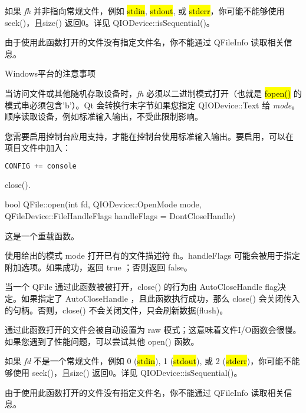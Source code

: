 \begin{compactitem}
\item 如果 \emph{fh} 并非指向常规文件，例如 \hl{stdin}, \hl{stdout}, 或 \hl{stderr}，你可能不能够使用 seek()，且size() 返回0。详见 QIODevice::isSequential()。
\item 由于使用此函数打开的文件没有指定文件名，你不能通过 QFileInfo 读取相关信息。
\end{compactitem}

Windows平台的注意事项

当访问文件或其他随机存取设备时，\emph{fh} 必须以二进制模式打开（也就是
\hl{fopen()} 的模式串必须包含'b'）。Qt 会转换行末字节如果您指定
QIODevice::Text 给 \emph{
mode}。顺序读取设备，例如标准输入输出，不受此限制影响。

您需要启用控制台应用支持，才能在控制台使用标准输入输出。要启用，可以在
项目文件中加入：

\begin{lstlisting}[language=C++]
CONFIG += console
\end{lstlisting}

\begin{notice}[另请参阅]
close().
\end{notice}

bool QFile::open(int fd, QIODevice::OpenMode mode, QFileDevice::FileHandleFlags handleFlags = DontCloseHandle)

这是一个重载函数。

使用给出的模式 mode 打开已有的文件描述符 fh。handleFlags 可能会被用于指定附加选项。如果成功，返回 true ；否则返回 false。

当一个 QFile 通过此函数被被打开，close() 的行为由 AutoCloseHandle flag决定。如果指定了 AutoCloseHandle ，且此函数执行成功，那么 close() 会关闭传入的句柄。否则，close() 不会关闭文件，只会刷新数据(flush)。

通过此函数打开的文件会被自动设置为 raw 模式；这意味着文件I/O函数会很慢。如果您遇到了性能问题，可以尝试其他 open() 函数。


\begin{notice}[警告]

\end{notice} 

\begin{compactitem}
\item 如果 \emph{fd} 不是一个常规文件，例如 0 (\hl{stdin}), 1 (\hl{stdout}), 或 2 (\hl{stderr})，你可能不能够使用 seek()，且size() 返回0。详见 QIODevice::isSequential()。
\item 由于使用此函数打开的文件没有指定文件名，你不能通过 QFileInfo 读取相关信息。

\end{compactitem}


